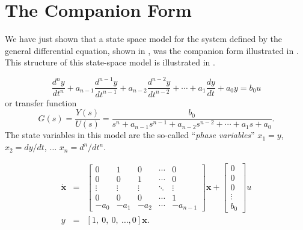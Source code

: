 \section*{The Companion Form}

We have just shown that a state space model
for the system defined by the general differential equation, shown
in , was the companion form illustrated in
. This structure of this state-space model is
illustrated in .
\begin{slide}\label{slide:l5s1}
\[ \frac{d^{n}y}{dt^{n}} +
a_{n-1}\frac{d^{n-1}y}{dt^{n-1}}+a_{n-2}\frac{d^{n-2}y}{dt^{n-2}}+\cdots+a_1\frac{dy}{dt}+a_0
y = b_0 u
\]
or transfer function
\[
G(s) = \frac{Y(s)}{U(s)} = \frac{b_0}{s^n +
a_{n-1}s^{n-1}+a_{n-2}s^{n-2}+\cdots+a_1s+a_0}.
\]
The state variables in this model are the so-called ``\emph{phase
variables}'' $x_1 = y$, $x_2 = dy/dt$, $\ldots$ $x_n = d^n/dt^n$.
\end{slide}
\begin{slide}\label{slide:l5s2}
\begin{eqnarray*} \dot{\mathbf{x}} &=&
\left[\begin{array}{ccccc}
  0 & 1 & 0 & \cdots & 0 \\
  0 & 0 & 1 & \cdots & 0 \\
  \vdots & \vdots & \vdots & \ddots & \vdots \\
  0 & 0 & 0 & \cdots & 1 \\
  -a_{0} & -a_{1} & -a_{2} & \cdots & -a_{n-1}
\end{array}\right]\mathbf{x}+\left[\begin{array}{c}
  0 \\
  0 \\
  0 \\
  \vdots \\
  b_0
\end{array}\right]u\\
y & = & [1,\ 0,\ 0,\ \ldots, 0] \mathbf{x}.
\end{eqnarray*}
\end{slide}
\begin{slide}\label{slide:l5s3}
\end{slide}

